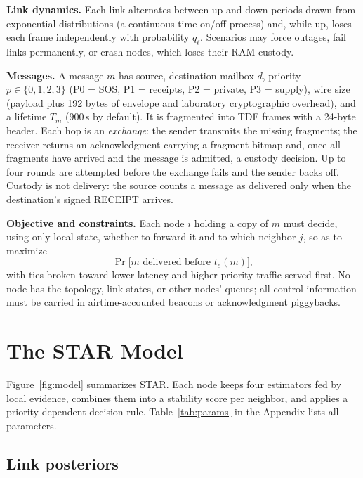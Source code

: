 \documentclass[jou,a4paper,11pt,floatsintext]{apa7}
\begin{document}
\textbf{Link dynamics.} Each link alternates between up and down periods drawn from exponential distributions (a continuous-time on/off process) and, while up, loses each frame independently with probability $q_\ell$. Scenarios may force outages, fail links permanently, or crash nodes, which loses their RAM custody.

\textbf{Messages.} A message $m$ has source, destination mailbox $d$, priority $p\in\{0,1,2,3\}$ (P0 = SOS, P1 = receipts, P2 = private, P3 = supply), wire size (payload plus 192 bytes of envelope and laboratory cryptographic overhead), and a lifetime $T_m$ (900\,s by default). It is fragmented into TDF frames with a 24-byte header. Each hop is an \emph{exchange}: the sender transmits the missing fragments; the receiver returns an acknowledgment carrying a fragment bitmap and, once all fragments have arrived and the message is admitted, a custody decision. Up to four rounds are attempted before the exchange fails and the sender backs off. Custody is not delivery: the source counts a message as delivered only when the destination's signed RECEIPT arrives.

\textbf{Objective and constraints.} Each node $i$ holding a copy of $m$ must decide, using only local state, whether to forward it and to which neighbor $j$, so as to maximize
\begin{equation}
\Pr\big[\text{$m$ delivered before } t_{e}(m)\big],
\end{equation}
with ties broken toward lower latency and higher priority traffic served first. No node has the topology, link states, or other nodes' queues; all control information must be carried in airtime-accounted beacons or acknowledgment piggybacks.

\section{The STAR Model}
\label{sec:model}



Figure~\ref{fig:model} summarizes STAR. Each node keeps four estimators fed by local evidence, combines them into a stability score per neighbor, and applies a priority-dependent decision rule. Table~\ref{tab:params} in the Appendix lists all parameters.

\subsection{Link posteriors}
\end{document}
